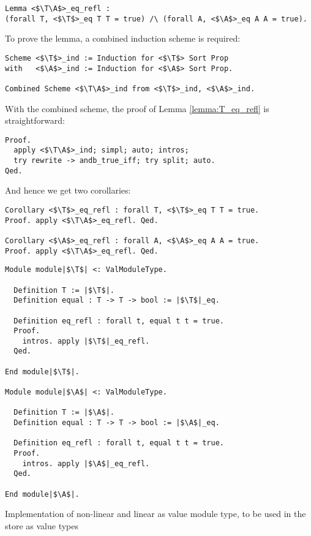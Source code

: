 \begin{verbatim}
Lemma <$\T\A$>_eq_refl :
(forall T, <$\T$>_eq T T = true) /\ (forall A, <$\A$>_eq A A = true).
\end{verbatim}

To prove the lemma, a combined induction scheme is required:

\begin{verbatim}
Scheme <$\T$>_ind := Induction for <$\T$> Sort Prop
with   <$\A$>_ind := Induction for <$\A$> Sort Prop.

Combined Scheme <$\T\A$>_ind from <$\T$>_ind, <$\A$>_ind.
\end{verbatim}

With the combined scheme, the proof of Lemma \ref{lemma:T_eq_refl} is straightforward:

\begin{verbatim}
Proof.
  apply <$\T\A$>_ind; simpl; auto; intros;
  try rewrite -> andb_true_iff; try split; auto.
Qed.
\end{verbatim}

And hence we get two corollaries:

\begin{verbatim}
Corollary <$\T$>_eq_refl : forall T, <$\T$>_eq T T = true.
Proof. apply <$\T\A$>_eq_refl. Qed.

Corollary <$\A$>_eq_refl : forall A, <$\A$>_eq A A = true.
Proof. apply <$\T\A$>_eq_refl. Qed.
\end{verbatim}

\begin{listing}[t]
\begin{verbatim}
Module module|$\T$| <: ValModuleType.

  Definition T := |$\T$|.
  Definition equal : T -> T -> bool := |$\T$|_eq.

  Definition eq_refl : forall t, equal t t = true.
  Proof.
    intros. apply |$\T$|_eq_refl.
  Qed.

End module|$\T$|.

Module module|$\A$| <: ValModuleType.

  Definition T := |$\A$|.
  Definition equal : T -> T -> bool := |$\A$|_eq.

  Definition eq_refl : forall t, equal t t = true.
  Proof.
    intros. apply |$\A$|_eq_refl.
  Qed.

End module|$\A$|.
\end{verbatim}
\caption{Implementation of non-linear and linear as value module type, to be used in the store as value types}
\label{listing:coq-moduleT-and-moduleA}
\end{listing}

